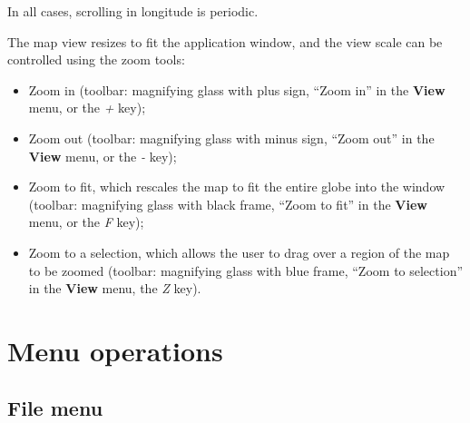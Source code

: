 \documentclass[11pt,makeidx,texhelp]{report}
\begin{document}
In all cases, scrolling in longitude is periodic.

The map view resizes to fit the application window, and the view scale
can be controlled using the zoom tools:
\begin{itemize}
  \item{Zoom in (toolbar: magnifying glass with plus sign, ``Zoom in''
    in the \textbf{View} menu, or the \textit{+} key);}
  \item{Zoom out (toolbar: magnifying glass with minus sign, ``Zoom
    out'' in the \textbf{View} menu, or the \textit{-} key);}
  \item{Zoom to fit, which rescales the map to fit the entire globe
    into the window (toolbar: magnifying glass with black frame,
    ``Zoom to fit'' in the \textbf{View} menu, or the \textit{F}
    key);}
  \item{Zoom to a selection, which allows the user to drag over a
    region of the map to be zoomed (toolbar: magnifying glass with
    blue frame, ``Zoom to selection'' in the \textbf{View} menu, the
    \textit{Z} key).}
\end{itemize}


\chapter{Menu operations}

\section{File menu}
\end{document}
